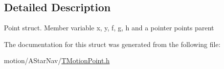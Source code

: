 \subsection{Detailed Description}
Point struct. Member variable x, y, f, g, h and a pointer points parent 

The documentation for this struct was generated from the following file\+:\begin{DoxyCompactItemize}
\item 
motion/\+A\+Star\+Nav/\mbox{\hyperlink{TMotionPoint_8h}{T\+Motion\+Point.\+h}}\end{DoxyCompactItemize}
